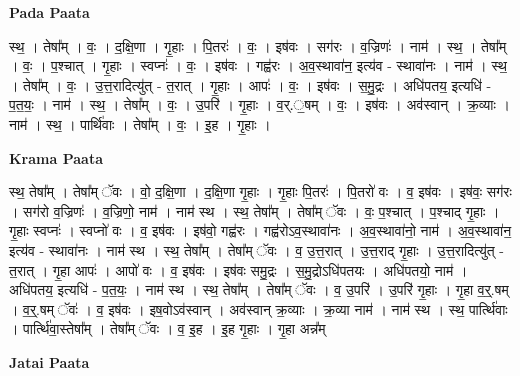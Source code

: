 \documentclass[17pt]{extarticle}
\begin{document}
\textbf{Pada Paata} \newline

स्थ॒ । तेषा᳚म् । वः॒ । द॒क्षि॒णा । गृ॒हाः । पि॒तरः॑ । वः॒ । इष॑वः । सग॑रः । व॒ज्रिणः॑ । नाम॑ । स्थ॒ । तेषा᳚म् । वः॒ । प॒श्चात् । गृ॒हाः । स्वप्नः॑ । वः॒ । इष॑वः । गह्व॑रः । अ॒व॒स्थावा॑न॒ इत्य॑व - स्थावा॑नः । नाम॑ । स्थ॒ । तेषा᳚म् । वः॒ । उ॒त्त॒रादित्यु॑त् - त॒रात् । गृ॒हाः । आपः॑ । वः॒ । इष॑वः । स॒मु॒द्रः । अधि॑पतय॒ इत्यधि॑ - प॒त॒यः॒ । नाम॑ । स्थ॒ । तेषा᳚म् । वः॒ । उ॒परि॑ । गृ॒हाः । व॒र्.॒षम् । वः॒ । इष॑वः । अव॑स्वान् । क्र॒व्याः । नाम॑ । स्थ॒ । पार्थि॑वाः । तेषा᳚म् । वः॒ । इ॒ह । गृ॒हाः ।  \newline


\textbf{Krama Paata} \newline

स्थ॒ तेषा᳚म् । तेषा᳚म् ॅवः । वो॒ द॒क्षि॒णा । द॒क्षि॒णा गृ॒हाः । गृ॒हाः पि॒तरः॑ । पि॒तरो॑ वः । व॒ इष॑वः । इष॑वः॒ सग॑रः । सग॑रो व॒ज्रिणः॑ । व॒ज्रिणो॒ नाम॑ । नाम॑ स्थ । स्थ॒ तेषा᳚म् । तेषा᳚म् ॅवः । वः॒ प॒श्चात् । प॒श्चाद् गृ॒हाः । गृ॒हाः स्वप्नः॑ । स्वप्नो॑ वः । व॒ इष॑वः । इष॑वो॒ गह्व॑रः । गह्व॑रोऽव॒स्थावा॑नः । अ॒व॒स्थावा॑नो॒ नाम॑ । अ॒व॒स्थावा॑न॒ इत्य॑व - स्थावा॑नः । नाम॑ स्थ । स्थ॒ तेषा᳚म् । तेषा᳚म् ॅवः । व॒ उ॒त्त॒रात् । उ॒त्त॒राद् गृ॒हाः । उ॒त्त॒रादित्यु॑त् - त॒रात् । गृ॒हा आपः॑ । आपो॑ वः । व॒ इष॑वः । इष॑वः समु॒द्रः । स॒मु॒द्रोऽधि॑पतयः । अधि॑पतयो॒ नाम॑ । अधि॑पतय॒ इत्यधि॑ - प॒त॒यः॒ । नाम॑ स्थ । स्थ॒ तेषा᳚म् । तेषा᳚म् ॅवः । व॒ उ॒परि॑ । उ॒परि॑ गृ॒हाः । गृ॒हा व॒र्॒.षम् । व॒र्॒.षम् ॅवः॑ । व॒ इष॑वः । इष॒वोऽव॑स्वान् । अव॑स्वान् क्र॒व्याः । क्र॒व्या नाम॑ । नाम॑ स्थ । स्थ॒ पार्त्थि॑वाः । पार्त्थि॑वा॒स्तेषा᳚म् । तेषा᳚म् ॅवः । व॒ इ॒ह । इ॒ह गृ॒हाः । गृ॒हा अन्न᳚म् \newline

\textbf{Jatai Paata} \newline
\end{document}
